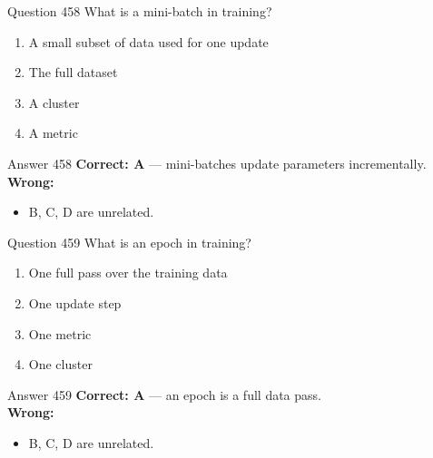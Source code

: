 \documentclass[aspectratio=169,11pt]{beamer}
\begin{document}
	\begin{frame}{Question 458}
		What is a mini-batch in training?
		\begin{enumerate}[label=\Alph*.]
			\item A small subset of data used for one update
			\item The full dataset
			\item A cluster
			\item A metric
		\end{enumerate}
	\end{frame}
	\begin{frame}{Answer 458}
		\textbf{Correct: A} --- mini-batches update parameters incrementally.\\
		\vspace{0.5em}
		\textbf{Wrong:}
		\begin{itemize}
			\item B, C, D are unrelated.
		\end{itemize}
	\end{frame}
	
	\begin{frame}{Question 459}
		What is an epoch in training?
		\begin{enumerate}[label=\Alph*.]
			\item One full pass over the training data
			\item One update step
			\item One metric
			\item One cluster
		\end{enumerate}
	\end{frame}
	\begin{frame}{Answer 459}
		\textbf{Correct: A} --- an epoch is a full data pass.\\
		\vspace{0.5em}
		\textbf{Wrong:}
		\begin{itemize}
			\item B, C, D are unrelated.
		\end{itemize}
	\end{frame}
	
\end{document}
